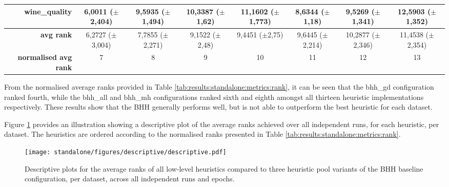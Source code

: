 \begin{table}[htb]
{\begin{tabular}{r|c|c|ccccc|}
			\textbf{wine\_quality}        & \cellcolor[rgb]{ 1,  .922,  .518}6,0011 ($\pm$2,404)                              & \cellcolor[rgb]{ .988,  .647,  .467}9,5935 ($\pm$1,494) & \cellcolor[rgb]{ .984,  .588,  .455}10,3387 ($\pm$1,62)  & \cellcolor[rgb]{ .98,  .525,  .443}11,1602 ($\pm$1,773)  & \cellcolor[rgb]{ .992,  .722,  .482}8,6344 ($\pm$1,18)   & \cellcolor[rgb]{ .988,  .651,  .467}9,5269 ($\pm$1,341)  & \cellcolor[rgb]{ .973,  .412,  .42}12,5903 ($\pm$1,352)  \\
			\midrule
			\textbf{avg rank}             & \cellcolor[rgb]{ 1,  .922,  .518}6,2727 ($\pm$3,004)                              & \cellcolor[rgb]{ .992,  .776,  .49}7,7855 ($\pm$2,271)  & \cellcolor[rgb]{ .988,  .639,  .467}9,1522 ($\pm$2,48)   & \cellcolor[rgb]{ .984,  .612,  .459}9,4451 ($\pm$2,75)   & \cellcolor[rgb]{ .984,  .592,  .455}9,6445 ($\pm$2,214)  & \cellcolor[rgb]{ .98,  .529,  .443}10,2877 ($\pm$2,346)  & \cellcolor[rgb]{ .973,  .412,  .42}11,4538 ($\pm$2,354)  \\
			\midrule
			\textbf{normalised avg rank}  & \cellcolor[rgb]{ 1,  .922,  .518}7                                                & \cellcolor[rgb]{ .996,  .839,  .502}8                   & \cellcolor[rgb]{ .992,  .753,  .486}9                    & \cellcolor[rgb]{ .988,  .667,  .471}10                   & \cellcolor[rgb]{ .984,  .584,  .455}11                   & \cellcolor[rgb]{ .98,  .498,  .439}12                    & \cellcolor[rgb]{ .973,  .412,  .42}13                    \\
			\cmidrule{3-3}\end{tabular}%
	}
\end{table}%



From the normalised average ranks provided in Table \ref{tab:results:standalone:metrics:rank}, it can be seen that the bhh\_gd configuration ranked fourth, while the bhh\_all and bhh\_mh configurations ranked sixth and eighth amongst all thirteen heuristic implementations respectively. These results show that the \acs{BHH} generally performs well, but is not able to outperform the best heuristic for each dataset.

Figure \ref{fig:results:standalone:descriptive:descriptive} provides an illustration showing a descriptive plot of the average ranks achieved over all independent runs, for each heuristic, per dataset. The heuristics are ordered according to the normalised ranks presented in Table \ref{tab:results:standalone:metrics:rank}.

\begin{figure}[htb]
	\centering
	\texttt{[image: standalone/figures/descriptive/descriptive.pdf]}
	\caption{Descriptive plots for the average ranks of all low-level heuristics compared to three heuristic pool variants of the \acs{BHH} baseline configuration, per dataset, across all independent runs and epochs.}
	\label{fig:results:standalone:descriptive:descriptive}
\end{figure}

